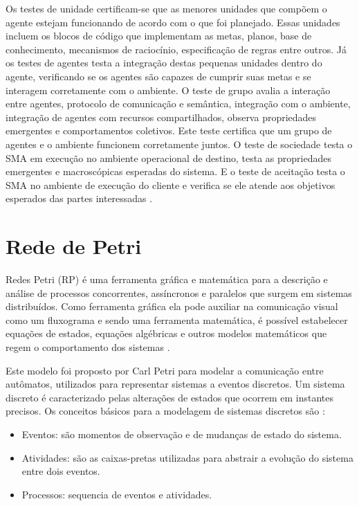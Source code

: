Os testes de unidade certificam-se que as menores unidades que compõem o agente estejam funcionando de acordo com o que foi planejado. Essas unidades incluem os blocos de código que implementam as metas, planos, base de conhecimento, mecanismos de raciocínio, especificação de regras entre outros. Já os testes de agentes testa a integração destas pequenas unidades  dentro do agente, verificando se os agentes são capazes de cumprir suas metas e se interagem corretamente com o ambiente. O teste de grupo avalia a interação entre agentes, protocolo de comunicação e semântica, integração com o ambiente, integração de agentes com recursos compartilhados, observa propriedades emergentes e comportamentos coletivos. Este teste certifica que um grupo de agentes e o ambiente funcionem corretamente juntos. O teste de sociedade testa o SMA em execução no ambiente operacional de destino, testa as propriedades emergentes e macroscópicas esperadas do sistema. E o teste de aceitação testa o SMA no ambiente de execução do cliente e verifica se ele atende aos objetivos esperados das partes interessadas \cite{nguyen2009thesis}.





\section{Rede de Petri}

 Redes Petri (RP) é uma ferramenta gráfica e matemática para a descrição e análise de processos concorrentes, assíncronos e paralelos que surgem em sistemas distribuídos. Como ferramenta gráfica ela pode auxiliar na comunicação visual como um fluxograma e sendo uma ferramenta matemática, é possível estabelecer equações de estados, equações algébricas e outros modelos matemáticos que regem o comportamento dos sistemas \citep{murata1989petri}. 

Este modelo foi proposto por Carl Petri para modelar a comunicação entre autômatos, utilizados para representar sistemas a eventos discretos. Um sistema discreto é caracterizado pelas alterações de estados que ocorrem em instantes precisos. Os conceitos básicos para a modelagem de sistemas discretos são \cite{cardoso1997redes}:

\begin{itemize}
\item Eventos: são momentos de observação e de mudanças de estado do sistema.
\item Atividades: são as caixas-pretas utilizadas para abstrair a evolução do sistema entre dois eventos.
\item Processos: sequencia de eventos e atividades.
\end{itemize}

